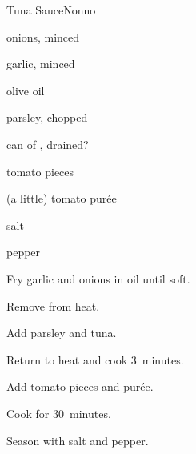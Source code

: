 \begin{recipe}{Tuna Sauce\FIXME}{Nonno}{}

\begin{ingredients}
\item onions, minced
\item garlic, minced
\item olive oil
\item parsley, chopped
\item can of , drained?
\item tomato pieces
\item (a little) tomato pur\'ee
\item salt
\item pepper
\end{ingredients}

\begin{directions}
\item Fry garlic and onions in oil until soft.
\item Remove from heat.
\item Add parsley and tuna.
\item Return to heat and cook 3~minutes.
\item Add tomato pieces and pur\'ee.
\item Cook for 30~minutes.
\item Season with salt and pepper.
\end{directions}

\end{recipe}
